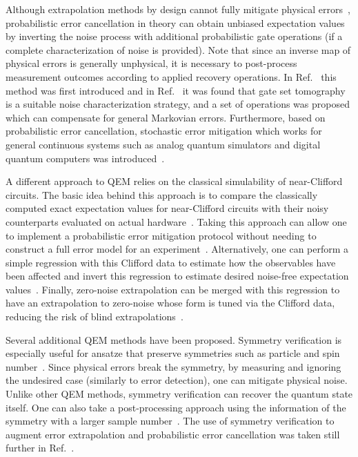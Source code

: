 \documentclass[prx,twocolumn,floatfix,superscriptaddress,longbibliography]{revtex4-1}
\newcommand{\<}{\langle}
\renewcommand{\>}{\rangle}
\begin{document}
Although extrapolation methods by design cannot fully mitigate physical errors~\cite{temme2017error,endo2018practical}, probabilistic error cancellation in theory can obtain unbiased expectation values by inverting the noise process with additional probabilistic gate operations (if a complete characterization of noise is provided). Note that since an inverse map of physical errors is generally unphysical, it is necessary to post-process measurement outcomes according to applied recovery operations.  In Ref.~\cite{temme2017error} this method was first introduced and in Ref.~\cite{endo2018practical} it was found that gate set tomography is a suitable noise characterization strategy, and a set of operations was proposed which can compensate for general Markovian errors. Furthermore, based on probabilistic error cancellation, stochastic error mitigation which works for general continuous systems such as analog quantum simulators and digital quantum computers was introduced~\cite{sun2020practical}.
        
A different approach to QEM relies on the classical simulability of near-Clifford circuits. The basic idea behind this approach is to compare the classically computed exact expectation values for near-Clifford circuits with their noisy counterparts evaluated on actual hardware~\cite{strikis2020learning,czarnik2020error,lowe2020unified}. Taking this approach can allow one to implement a probabilistic error mitigation protocol without needing to construct a full error model for an experiment~\cite{strikis2020learning}. Alternatively, one can perform a simple regression with this Clifford data to estimate how the observables have been affected and invert this regression to estimate desired noise-free expectation values~\cite{czarnik2020error}. Finally, zero-noise extrapolation can be merged with this regression to have an extrapolation to zero-noise whose form is tuned via the Clifford data, reducing the risk of blind extrapolations~\cite{lowe2020unified}.

Several additional QEM methods have been proposed. Symmetry verification is especially useful for ansatze that preserve symmetries such as particle and spin number~\cite{mcardle2019error,bonet2018low,otten2019noise}. Since physical errors break the symmetry, by measuring and ignoring the undesired case (similarly to error detection), one can mitigate physical noise. Unlike other QEM methods, symmetry verification can recover the quantum state itself. One can also take a post-processing approach using the information of the symmetry with a larger sample number~\cite{bonet2018low}. The use of symmetry verification to augment error extrapolation and probabilistic error cancellation was taken still further in Ref.~\cite{cai2020multiexponential}. 
\end{document}
